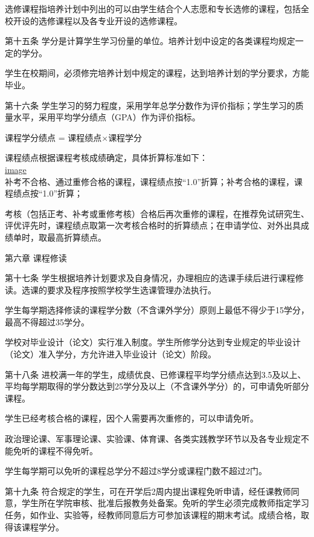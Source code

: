 \documentclass[UTF8,12pt,a4paper]{report}
\begin{document}
选修课程指培养计划中列出的可以由学生结合个人志愿和专长选修的课程，包括全校开设的选修课程以及各专业开设的选修课程。

第十五条  学分是计算学生学习份量的单位。培养计划中设定的各类课程均规定一定的学分。

学生在校期间，必须修完培养计划中规定的课程，达到培养计划的学分要求，方能毕业。

第十六条  学生学习的努力程度，采用学年总学分数作为评价指标；学生学习的质量水平，采用平均学分绩点（GPA）作为评价指标。

课程学分绩点 = 课程绩点$\times$课程学分

课程绩点根据课程考核成绩确定，具体折算标准如下：\\

\href{http://img01.fs.yiban.cn/out/thumb_550x0/aHR0cDovL3lmczAxLmZzLnlpYmFuLmNuL3dlYi83NTg4OTE0L3VwbG9hZC8xNTA0NzY5NDc2Mzc4OTYyLnBuZw==}{image}\\

补考不合格、通过重修合格的课程，课程绩点按“1.0”折算；补考合格的课程，课程绩点按“1.0”折算；

考核（包括正考、补考或重修考核）合格后再次重修的课程，在推荐免试研究生、评优评先时，课程绩点取第一次考核合格时的折算绩点；在申请学位、对外出具成绩单时，取最高折算绩点。



第六章  课程修读

第十七条  学生根据培养计划要求及自身情况，办理相应的选课手续后进行课程修读。选课的要求及程序按照学校学生选课管理办法执行。

学生每学期选择修读的课程学分数（不含课外学分）原则上最低不得少于15学分，最高不得超过35学分。

学校对毕业设计（论文）实行准入制度。学生所修学分达到专业规定的毕业设计（论文）准入学分，方允许进入毕业设计（论文）阶段。

第十八条  进校满一年的学生，成绩优良、已修课程平均学分绩点达到3.5及以上、平均每学期取得的学分数达到25学分及以上（不含课外学分）的，可申请免听部分课程。

学生已经考核合格的课程，因个人需要再次重修的，可以申请免听。

政治理论课、军事理论课、实验课、体育课、各类实践教学环节以及各专业规定不能免听的课程不得免听。

学生每学期可以免听的课程总学分不超过8学分或课程门数不超过2门。

第十九条  符合规定的学生，可在开学后2周内提出课程免听申请，经任课教师同意，学生所在学院审核、批准后报教务处备案。免听的学生必须完成教师指定学习任务，如作业、实验等，经教师同意后方可参加该课程的期末考试。成绩合格，取得该课程学分。
\end{document}
